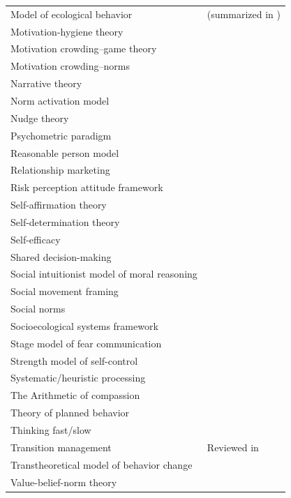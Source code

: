 \documentclass[12 pt]{article}
\begin{document}
\begin{longtable}{l|p{8cm}}
	Model of ecological behavior & \cite{Fietkau1981} (summarized in \textcite{Kollmuss2002}) \\ 
	Motivation-hygiene theory & \cite{Herzberg1968} \\ 
	Motivation crowding--game theory  & \cite{Gneezy2000} \\ 
	Motivation crowding--norms & \cite{Gneezy2000} \\ 
	Narrative theory & \cite{Polletta1998} \\ 
	Norm activation model & \cite{Schwartz1977, DeGroot2009} \\ 
	Nudge theory & \cite{Wilk1999,Thaler2008} \\ 
	Psychometric paradigm  & \cite{Slovic1987} \\ 
	Reasonable person model & \cite{Kaplan2009} \\ 
	Relationship marketing & \cite{Morgan1994} \\ 
	Risk perception attitude framework & \cite{Rimal2001} \\ 
	Self-affirmation theory & \cite{Cohen2000} \\ 
	Self-determination theory  & \cite{Ryan2000, Ryan2000a} \\ 
	Self-efficacy & \cite{Bandura1977} \\ 
	Shared decision-making & \cite{Weiss1995} \\ 
	Social intuitionist model of moral reasoning & \cite{Haidt2001} \\ 
	Social movement framing & \cite{Benford2000} \\ 
	Social norms & \cite{Schultz2007, Farrow2017} \\ 
	Socioecological systems framework & \cite{Mcginnis2014} \\ 
	Stage model of fear communication  & \cite{DeHoog2007} \\ 
	Strength model of self-control  & \cite{Hagger2010} \\ 
	Systematic/heuristic processing & \cite{Chaiken1980} \\ 
	The Arithmetic of compassion & \cite{Vastfjall2016} \\ 
	Theory of planned behavior  & \cite{Ajzen1985} \\ 
	Thinking fast/slow & \cite{Kahneman2011} \\ 
	Transition management & Reviewed in \cite{Shove2007, Shove2010} \\ 
	Transtheoretical model of behavior change  & \cite{Prochaska1997} \\ 
	Value-belief-norm theory & \cite{Stern1999, Stern2000} \\ 
	\hline
	\hline
\end{longtable}
\end{document}
